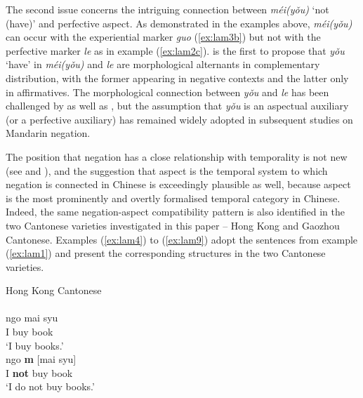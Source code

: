 \documentclass[output=paper,colorlinks,citecolor=brown,chinesefont]{langscibook}
\begin{document}
The second issue concerns the intriguing connection between \textit{méi(yǒu)} `not (have)' and perfective aspect. As demonstrated in the examples above, \textit{méi(yǒu)} can occur with the experiential marker \textit{guo} (\ref{ex:lam3b}) but not with the perfective marker \textit{le} as in example (\ref{ex:lam2c}). \cite{Wang1965} is the first to propose that \textit{yǒu} `have' in \textit{méi(yǒu)} and \textit{le} are morphological alternants in complementary distribution, with the former appearing in negative contexts and the latter only in affirmatives. The morphological connection between \textit{yǒu} and \textit{le} has been challenged by \citet[434--438]{LiThompson1981} as well as \cite{Li2007}, but the assumption that \textit{yǒu} is an aspectual auxiliary (or a perfective auxiliary) has remained widely adopted in subsequent studies on Mandarin negation.

The position that negation has a close relationship with temporality is not new (see \citealt{Zanuttini2001} and \citealt{Miestamo2005}), and the suggestion that aspect is the temporal system to which negation is connected in Chinese is exceedingly plausible as well, because aspect is the most prominently and overtly formalised temporal category in Chinese. Indeed, the same negation-aspect compatibility pattern is also identified in the two Cantonese varieties investigated in this paper – Hong Kong and Gaozhou Cantonese. Examples (\ref{ex:lam4}) to (\ref{ex:lam9}) adopt the sentences from example (\ref{ex:lam1}) and present the corresponding structures in the two Cantonese varieties.

\ea Hong Kong Cantonese \label{ex:lam4}\\
   \label{ex:lam4a}\\
    \gll ngo	mai	syu\\
	I buy book\\
	\glt `I buy books.'
   \label{ex:lam4b}\\
    \gll ngo	 \textbf{m} [mai syu]\\ 
	I \textbf{not} buy book\\
	\glt `I do not buy books.'
\z \z
\end{document}
